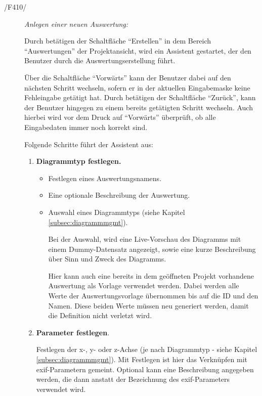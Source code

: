 	\begin{description}
		
		\item[/F410/] \textit{Anlegen einer neuen Auswertung:}\par Durch betätigen der Schaltfläche "`Erstellen"' in dem Bereich "`Auswertungen"' der Projektansicht, wird ein Assistent gestartet, der den Benutzer durch die Auswertungserstellung führt.\par Über die Schaltfläche "`Vorwärts"' kann der Benutzer dabei auf den nächsten Schritt wechseln, sofern er in der aktuellen Eingabemaske keine Fehleingabe getätigt hat. Durch betätigen der Schaltfläche "`Zurück"', kann der Benutzer hingegen zu einem bereits getätigten Schritt wechseln. Auch hierbei wird vor dem Druck auf "`Vorwärts"' überprüft, ob alle Eingabedaten immer noch korrekt sind.\par Folgende Schritte führt der Assistent aus:

			\begin{enumerate}

				\item \textbf{Diagrammtyp festlegen.}

					\begin{itemize}

						\item Festlegen eines Auswertungsnamens.

						\item Eine optionale Beschreibung der Auswertung.

						\item Auswahl eines Diagrammtyps (siehe Kapitel \ref{subsec:diagrammmgmt}).\par Bei der Auswahl, wird eine Live-Vorschau des Diagramms mit einem Dummy-Datensatz angezeigt, sowie eine kurze Beschreibung über Sinn und Zweck des Diagramms.\par Hier kann auch eine bereits in dem geöffneten Projekt vorhandene Auswertung als Vorlage verwendet werden. Dabei werden alle Werte der Auswertungsvorlage übernommen bis auf die ID und den Namen. Diese beiden Werte müssen neu generiert werden, damit die Definition nicht verletzt wird.

					\end{itemize}

				\item \textbf{Parameter festlegen}.\par Festlegen der x-, y- oder z-Achse (je nach Diagrammtyp - siehe Kapitel \ref{subsec:diagrammmgmt}). Mit Festlegen ist hier das Verknüpfen mit \gls{exif}-Parametern gemeint. Optional kann eine Beschreibung angegeben werden, die dann anstatt der Bezeichnung des \gls{exif}-Parameters verwendet wird.


\end{enumerate}
\end{description}
